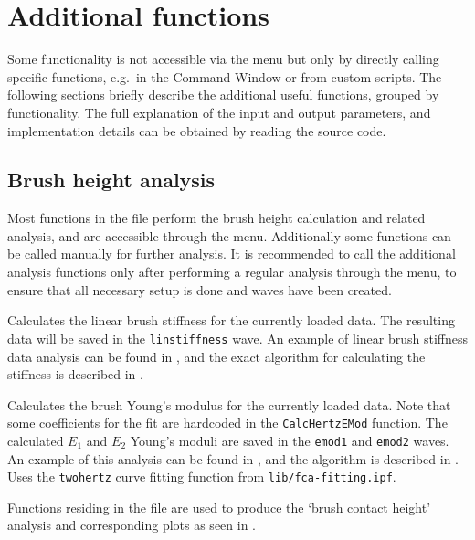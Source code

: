 \documentclass[12pt,a4paper]{article}
\begin{document}
\section{Additional functions}
\label{sec:afmsoftware-functions}
Some functionality is not accessible via the  menu but only by directly calling specific functions, e.g.\ in the Command Window or from custom scripts.
The following sections briefly describe the additional useful functions, grouped by functionality.
The full explanation of the input and output parameters, and implementation details can be obtained by reading the source code.

\subsection{Brush height analysis}
Most functions in the file  perform the brush height calculation and related analysis, and are accessible through the menu. Additionally some functions can be called manually for further analysis.
It is recommended to call the additional analysis functions only after performing a regular analysis through the menu, to ensure that all necessary setup is done and waves have been created.

\begin{description}[style=nextline]

\item[CalcLinStiffness]
Calculates the linear brush stiffness for the currently loaded data. The resulting data will be saved in the \texttt{linstiffness} wave.
An example of linear brush stiffness data analysis can be found in \cite[p.~68]{hyotyla2016}, and the exact algorithm for calculating the stiffness is
described in \cite[p.~33]{hyotyla2016}.

\item[CalcHertzEModAll]
Calculates the brush Young's modulus for the currently loaded data. Note that some coefficients for the fit are hardcoded in the \texttt{CalcHertzEMod} function.
The calculated $E_1$ and $E_2$ Young's moduli are saved in the \texttt{emod1} and \texttt{emod2} waves.
An example of this analysis can be found in \cite[p.~68]{hyotyla2016}, and the algorithm is described in \cite[p.~33]{hyotyla2016}.
Uses the \texttt{twohertz} curve fitting function from \texttt{lib/fca-fitting.ipf}.


\end{description}


Functions residing in the file  are used to produce the \enquote*{brush contact height} analysis and corresponding plots as seen in \cite[p.~57]{hyotyla2016}.
\end{document}
